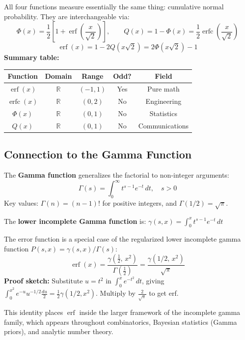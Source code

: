 \documentclass[11pt]{article}
\begin{document}
\begin{theorembox}
All four functions measure essentially the same thing: cumulative normal probability. They are interchangeable via:
\[
\Phi(x) = \frac{1}{2}\!\left[1 + \operatorname{erf}\!\left(\frac{x}{\sqrt{2}}\right)\right], \qquad
Q(x) = 1 - \Phi(x) = \frac{1}{2}\operatorname{erfc}\!\left(\frac{x}{\sqrt{2}}\right)
\]
\[
\operatorname{erf}(x) = 1 - 2Q(x\sqrt{2}) = 2\Phi(x\sqrt{2}) - 1
\]
\textbf{Summary table:}
\begin{center}
\begin{tabular}{ccccc}
\toprule
Function & Domain & Range & Odd? & Field \\
\midrule
$\operatorname{erf}(x)$ & $\mathbb{R}$ & $(-1,1)$ & Yes & Pure math \\
$\operatorname{erfc}(x)$ & $\mathbb{R}$ & $(0,2)$ & No & Engineering \\
$\Phi(x)$ & $\mathbb{R}$ & $(0,1)$ & No & Statistics \\
$Q(x)$ & $\mathbb{R}$ & $(0,1)$ & No & Communications \\
\bottomrule
\end{tabular}
\end{center}
\end{theorembox}

\subsection{Connection to the Gamma Function}

\begin{defnbox}
The \textbf{Gamma function} generalizes the factorial to non-integer arguments:
\[
\Gamma(s) = \int_{0}^{\infty} t^{s-1}e^{-t}\,dt, \quad s > 0
\]
Key values: $\Gamma(n) = (n-1)!$ for positive integers, and $\Gamma(1/2) = \sqrt{\pi}$.

The \textbf{lower incomplete Gamma function} is:
$\gamma(s, x) = \int_{0}^{x} t^{s-1}e^{-t}\,dt$
\end{defnbox}

\begin{theorembox}
The error function is a special case of the regularized lower incomplete gamma function $P(s,x) = \gamma(s,x)/\Gamma(s)$:
\[
\operatorname{erf}(x) = \frac{\gamma\!\left(\tfrac{1}{2},\, x^2\right)}{\Gamma\!\left(\tfrac{1}{2}\right)} = \frac{\gamma(1/2,\, x^2)}{\sqrt{\pi}}
\]
\textbf{Proof sketch:} Substitute $u = t^2$ in $\int_0^x e^{-t^2}\,dt$, giving $\int_0^{x^2} e^{-u} u^{-1/2} \frac{du}{2} = \frac{1}{2}\gamma(1/2, x^2)$. Multiply by $\frac{2}{\sqrt{\pi}}$ to get erf.

This identity places $\operatorname{erf}$ inside the larger framework of the incomplete gamma family, which appears throughout combinatorics, Bayesian statistics (Gamma priors), and analytic number theory.
\end{theorembox}
\end{document}
